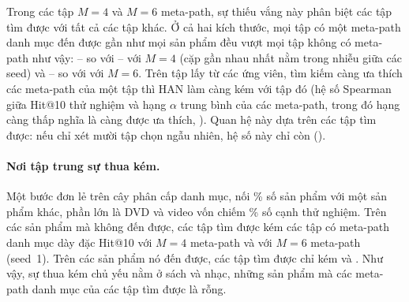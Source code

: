 

Trong các tập $M = 4$ và $M = 6$ meta-path, sự thiếu vắng này phân biệt các tập tìm được với tất cả các
tập khác. Ở cả hai kích thước, mọi tập có một meta-path danh mục đến được gần như mọi sản phẩm
đều vượt mọi tập không có meta-path như vậy: -- so với
-- với $M = 4$ (cặp gần nhau nhất nằm trong
nhiễu giữa các seed) và -- so với 
với $M = 6$. Trên  tập lấy từ các ứng viên, tìm kiếm càng ưa thích các meta-path của
một tập thì HAN làm càng kém với tập đó (hệ số Spearman  giữa Hit@10 thử nghiệm và
hạng $\alpha$ trung bình của các meta-path, trong đó hạng càng thấp nghĩa là càng được ưa thích,
). Quan hệ này dựa trên các tập tìm được: nếu chỉ xét mười tập chọn ngẫu nhiên,
hệ số này chỉ còn  ().

\paragraph{Nơi tập trung sự thua kém.} Một bước đơn lẻ trên cây phân cấp danh mục,  nối
\% số sản phẩm với một sản phẩm khác, phần lớn là DVD và video vốn
chiếm \% số cạnh thử nghiệm. Trên các sản phẩm mà  không đến
được, các tập tìm được kém các tập có meta-path danh mục dày đặc  Hit@10 với $M = 4$ meta-path
và  với $M = 6$ meta-path (seed~1). Trên các sản phẩm nó đến được, các tập tìm được chỉ kém
 và . Như vậy, sự thua kém chủ yếu nằm ở sách và
nhạc, những sản phẩm mà các meta-path danh mục của các tập tìm được là rỗng.

